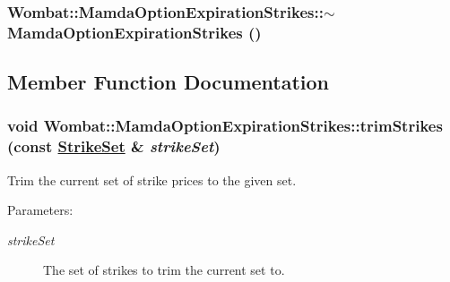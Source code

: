 \hypertarget{classWombat_1_1MamdaOptionExpirationStrikes_b14cea3c5ad5ebd030d6645061b78594}{
\subsubsection[$\sim$MamdaOptionExpirationStrikes]{\setlength{\rightskip}{0pt plus 5cm}Wombat::Mamda\-Option\-Expiration\-Strikes::$\sim$Mamda\-Option\-Expiration\-Strikes ()}}
\label{classWombat_1_1MamdaOptionExpirationStrikes_b14cea3c5ad5ebd030d6645061b78594}




\subsection{Member Function Documentation}
\hypertarget{classWombat_1_1MamdaOptionExpirationStrikes_330d769f863bff08e54cc0c5bc618908}{
\subsubsection[trimStrikes]{\setlength{\rightskip}{0pt plus 5cm}void Wombat::Mamda\-Option\-Expiration\-Strikes::trim\-Strikes (const \hyperlink{namespaceWombat_302d481a195bac5c9315c82cdbc79447}{Strike\-Set} \& {\em strike\-Set})}}
\label{classWombat_1_1MamdaOptionExpirationStrikes_330d769f863bff08e54cc0c5bc618908}


Trim the current set of strike prices to the given set. 

\begin{Desc}
\item[Parameters:]
\begin{description}
\item[{\em strike\-Set}]The set of strikes to trim the current set to. \end{description}
\end{Desc}
